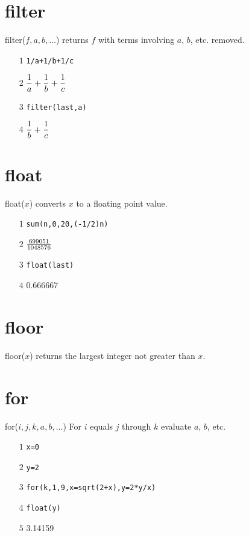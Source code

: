\documentclass[12pt,openany]{report}
\begin{document}
\section*{filter}
filter($f,a,b,\ldots$) returns $f$ with terms involving $a$, $b$, etc. removed.
\begin{itemize}
\item[$\scriptstyle1$]{\tt 1/a+1/b+1/c}
\item[$\scriptstyle2$]\hspace{50pt} $\displaystyle{{1\over a}+{1\over b}+{1\over c}}$
\item[$\scriptstyle3$]{\tt filter(last,a)}
\item[$\scriptstyle4$]\hspace{50pt} $\displaystyle{{1\over b}+{1\over c}}$
\end{itemize}

\section*{float}
float($x$) converts $x$ to a floating point value.
\begin{itemize}
\item[$\scriptstyle1$]{\tt sum(n,0,20,(-1/2){}n)}
\item[$\scriptstyle2$]\hspace{50pt} $699051\over1048576$
\item[$\scriptstyle3$]{\tt float(last)}
\item[$\scriptstyle4$]\hspace{50pt} 0.666667
\end{itemize}

\section*{floor}
floor($x$) returns the largest integer not greater than $x$.

\section*{for}
for($i,j,k,a,b,\ldots$) For $i$ equals $j$ through $k$ evaluate $a$, $b$, etc.
\begin{itemize}
\item[$\scriptstyle1$]{\tt x=0}
\item[$\scriptstyle2$]{\tt y=2}
\item[$\scriptstyle3$]{\tt for(k,1,9,x=sqrt(2+x),y=2*y/x)}
\item[$\scriptstyle4$]{\tt float(y)}
\item[$\scriptstyle5$]\hspace{50pt} 3.14159
\end{itemize}
\end{document}
